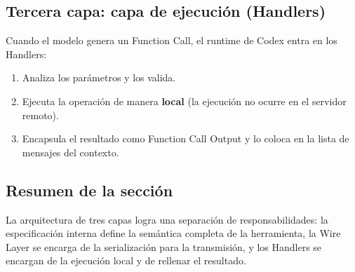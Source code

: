 \subsection{Tercera capa: capa de ejecución (Handlers)}

Cuando el modelo genera un Function Call, el runtime de Codex entra en los Handlers:
\begin{enumerate}
    \item Analiza los parámetros y los valida.
    \item Ejecuta la operación de manera \textbf{local} (la ejecución no ocurre en el servidor remoto).
    \item Encapsula el resultado como Function Call Output y lo coloca en la lista de mensajes del contexto.
\end{enumerate}

\subsection{Resumen de la sección}

La arquitectura de tres capas logra una separación de responsabilidades: la especificación interna define la semántica completa de la herramienta, la Wire Layer se encarga de la serialización para la transmisión, y los Handlers se encargan de la ejecución local y de rellenar el resultado.


